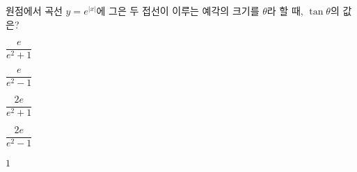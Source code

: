 원점에서 곡선 $y=e^{|x|}$에 그은 두 접선이 이루는 예각의 크기를 $\theta$라 할 때, $\tan\theta$의 값은?
\begin{choices32}{\rule[-3ex]{0pt}{8ex}$\dfrac{e}{e^2+1}$}{\rule[-3ex]{0pt}{8ex}$\dfrac{e}{e^2-1}$}{\rule[-3ex]{0pt}{8ex}$\dfrac{2e}{e^2+1}$}{\rule[-3ex]{0pt}{8ex}$\dfrac{2e}{e^2-1}$}{\rule[-3ex]{0pt}{8ex}$1$}\end{choices32}
